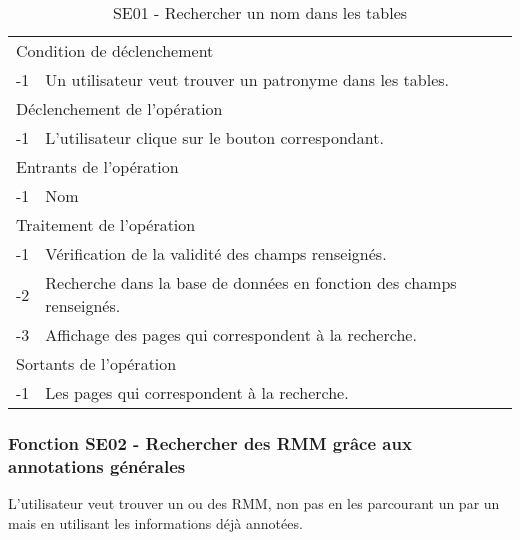 \documentclass[a4paper]{article}
\begin{document}
\begin{table}[H]
  \centering
   \small
	\begin{tabular}{|c|p{12cm}|}
   		\hline
   			\rowcolor{lightgray}\multicolumn{2}{|c|}{\textbf{SE01 - Rechercher un nom dans les tables}} \\
   		\hline
   			\multicolumn{2}{|l|}{Condition de d\'eclenchement} \\
   		\hline
   			-1 & Un utilisateur veut trouver un patronyme dans les tables. \\
   		\hline
   			\multicolumn{2}{|l|}{D\'eclenchement de l'op\'eration} \\
   		\hline
   			-1 & L'utilisateur clique sur le bouton correspondant. \\
   		\hline
   			\multicolumn{2}{|l|}{Entrants de l'op\'eration} \\
   		\hline
   			-1 & Nom \\
   		\hline
   			\multicolumn{2}{|l|}{Traitement de l'op\'eration} \\
  		\hline
  			-1 & Vérification de la validité des champs renseignés. \\
   			-2 & Recherche dans la base de données en fonction des champs renseignés. \\
        	-3 & Affichage des pages qui correspondent à la recherche. \\
   		\hline
   			\multicolumn{2}{|l|}{Sortants de l'op\'eration} \\
   		\hline
   			-1 & Les pages qui correspondent à la recherche. \\
   		\hline
	\end{tabular}
  \caption{SE01 - Rechercher un nom dans les tables}
  \normalsize
  \label{tab:SE01}
\end{table}

\subsubsection{Fonction SE02 - Rechercher des RMM grâce aux annotations générales}

L'utilisateur veut trouver un ou des RMM, non pas en les parcourant un par un mais en utilisant les informations déjà annotées.
\\
\end{document}
